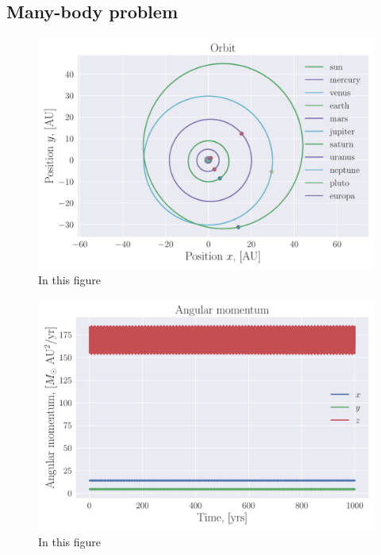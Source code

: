 \documentclass[reprint, english,notitlepage,nofootinbib]{revtex4-1}  %
\begin{document}
\subsection{Many-body problem}

\begin{figure}[h]
	\centering
	\includegraphics[width=\linewidth]{../output/all-verlet-5-8-2.pdf}
	\caption{In this figure 
		\label{fig:all}}
\end{figure}

\begin{figure}[h]
	\centering
	\includegraphics[width=\linewidth]{../output/all-verlet-5-8-2_ang_mom.pdf}
	\caption{In this figure 
		\label{fig:all_ang_mom}}
\end{figure}
\end{document}
